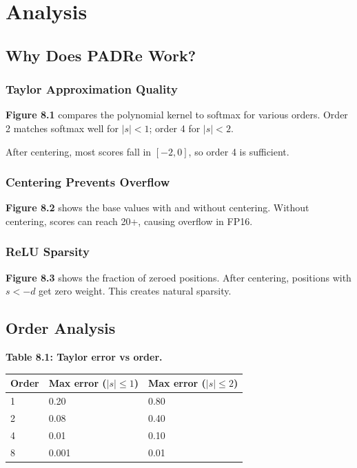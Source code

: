 \section{Analysis}

\subsection{Why Does PADRe Work?}

\subsubsection{Taylor Approximation Quality}

\textbf{Figure 8.1} compares the polynomial kernel to softmax for various orders. 
Order 2 matches softmax well for $|s| < 1$; order 4 for $|s| < 2$.

After centering, most scores fall in $[-2, 0]$, so order 4 is sufficient.

\subsubsection{Centering Prevents Overflow}

\textbf{Figure 8.2} shows the base values with and without centering. Without 
centering, scores can reach 20+, causing overflow in FP16.

\subsubsection{ReLU Sparsity}

\textbf{Figure 8.3} shows the fraction of zeroed positions. After centering, 
positions with $s < -d$ get zero weight. This creates natural sparsity.

\subsection{Order Analysis}

\textbf{Table 8.1: Taylor error vs order.}

\begin{table}[H]
\centering
\small
\begin{tabular}{lll}
\toprule
\textbf{Order} & \textbf{Max error ($|s| \leq 1$)} & \textbf{Max error ($|s| \leq 2$)} \\
\midrule
1 & 0.20 & 0.80 \\
2 & 0.08 & 0.40 \\
4 & 0.01 & 0.10 \\
8 & 0.001 & 0.01 \\
\bottomrule
\end{tabular}
\end{table}

